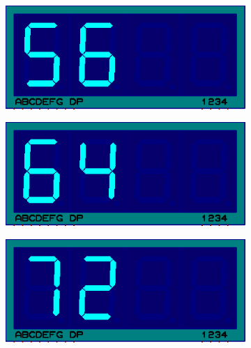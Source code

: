 \documentclass{lab_sheet}
\begin{document}
\begin{figure}[H]
\begin{subfigure}{.33\textwidth}
            \end{subfigure}
            \newline
            \begin{subfigure}{.33\textwidth}
                \centering
                \includegraphics[frame,width=.9\linewidth]{../Figures/m56}   
                \caption{}
                \label{fig:prob4-g}
              \end{subfigure}
              \begin{subfigure}{.33\textwidth}
                \centering
                \includegraphics[frame,width=.9\linewidth]{../Figures/m64}   
                \caption{}
                \label{fig:prob4-h}
              \end{subfigure}
              \begin{subfigure}{.33\textwidth}
                \centering
                \includegraphics[frame,width=.9\linewidth]{../Figures/m72}   
                \caption{}
                \label{fig:prob4-i}

\end{subfigure}
\end{figure}
\end{document}
